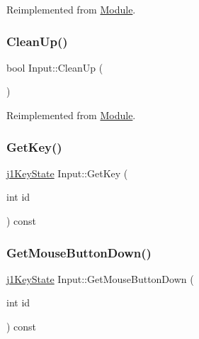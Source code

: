 Reimplemented from \mbox{\hyperlink{class_module_a4a283650cf8a73aa0b5599106bc2ba6c}{Module}}.

\mbox{\label{class_input_a6cad2fca1092afa12ae299dcc4fe7c49}} 
\subsubsection{\texorpdfstring{CleanUp()}{CleanUp()}}
{\footnotesize\ttfamily bool Input\+::\+Clean\+Up (\begin{DoxyParamCaption}{ }\end{DoxyParamCaption})\hspace{0.3cm}{\ttfamily [virtual]}}



Reimplemented from \mbox{\hyperlink{class_module_a77d7a006e42c0bd10110e1adbd4598cb}{Module}}.

\mbox{\label{class_input_abfcdffdbed22511d1b8d6535132c6990}} 
\subsubsection{\texorpdfstring{GetKey()}{GetKey()}}
{\footnotesize\ttfamily \mbox{\hyperlink{_input_8h_aea34d794e9a93d93622f3600b7eaf229}{j1\+Key\+State}} Input\+::\+Get\+Key (\begin{DoxyParamCaption}\item[{int}]{id }\end{DoxyParamCaption}) const\hspace{0.3cm}{\ttfamily [inline]}}

\mbox{\label{class_input_a966ec0abafd0ed1a773bfb468d4cd6b7}} 
\subsubsection{\texorpdfstring{GetMouseButtonDown()}{GetMouseButtonDown()}}
{\footnotesize\ttfamily \mbox{\hyperlink{_input_8h_aea34d794e9a93d93622f3600b7eaf229}{j1\+Key\+State}} Input\+::\+Get\+Mouse\+Button\+Down (\begin{DoxyParamCaption}\item[{int}]{id }\end{DoxyParamCaption}) const\hspace{0.3cm}{\ttfamily [inline]}}

